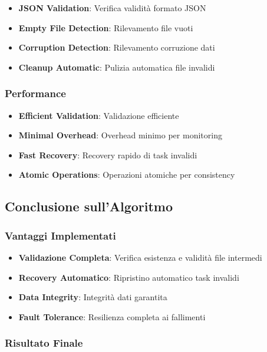 \documentclass[12pt,a4paper]{article}
\begin{document}
\begin{itemize}
\item \textbf{JSON Validation}: Verifica validità formato JSON
\item \textbf{Empty File Detection}: Rilevamento file vuoti
\item \textbf{Corruption Detection}: Rilevamento corruzione dati
\item \textbf{Cleanup Automatic}: Pulizia automatica file invalidi
\end{itemize}

\subsubsection{Performance}

\begin{itemize}
\item \textbf{Efficient Validation}: Validazione efficiente
\item \textbf{Minimal Overhead}: Overhead minimo per monitoring
\item \textbf{Fast Recovery}: Recovery rapido di task invalidi
\item \textbf{Atomic Operations}: Operazioni atomiche per consistency
\end{itemize}

\subsection{Conclusione sull'Algoritmo}

\subsubsection{Vantaggi Implementati}

\begin{itemize}
\item \textbf{Validazione Completa}: Verifica esistenza e validità file intermedi
\item \textbf{Recovery Automatico}: Ripristino automatico task invalidi
\item \textbf{Data Integrity}: Integrità dati garantita
\item \textbf{Fault Tolerance}: Resilienza completa ai fallimenti
\end{itemize}

\subsubsection{Risultato Finale}
\end{document}

